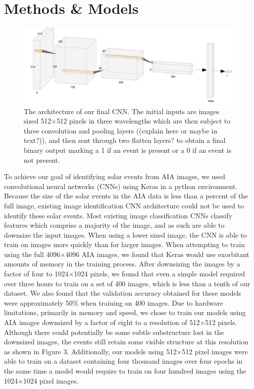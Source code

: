 \documentclass[12pt, letterpaper]{article}
\begin{document}
\section*{Methods \& Models}


\begin{figure}[h]
	\centering
	\includegraphics[]{figures/cnn_arch.png}
	\caption{The architecture of our final CNN. The initial inputs are images sized 512$\times$512 pixels in three wavelengths which are then subject to three convolution and pooling layers ((explain here or maybe in text?)), and then sent through two flatten layers? to obtain a final binary output marking a 1 if an event is present or a 0 if an event is not present.}
	\label{cnn_arch}
\end{figure}

To achieve our goal of identifying solar events from AIA images, we used convolutional neural networks (CNNs) using Keras in a python environment. Because the size of the solar events in the AIA data is less than a percent of the full image, existing image identification CNN architecture could not be used to identify these solar events. Most existing image classification CNNs classify features which comprise a majority of the image, and as such are able to downsize the input images. When using a lower sized image, the CNN is able to train on images more quickly than for larger images. When attempting to train using the full 4096$\times$4096 AIA images, we found that Keras would use exorbitant amounts of memory in the training process. After downsizing the images by a factor of four to 1024$\times$1024 pixels, we found that even a simple model required over three hours to train on a set of 400 images, which is less than a tenth of our dataset. We also found that the validation accuracy obtained for these models were approximately 50\% when training on 400 images. Due to hardware limitations, primarily in memory and speed, we chose to train our models using AIA images downsized by a factor of eight to a resolution of 512$\times$512 pixels. Although there could potentially be some subtle substructure lost in the downsized images, the events still retain some visible structure at this resolution as shown in Figure 3. Additionally, our models using 512$\times$512 pixel images were able to train on a dataset containing four thousand images over four epochs in the same time a model would require to train on four hundred images using the 1024$\times$1024 pixel images.
\end{document}
